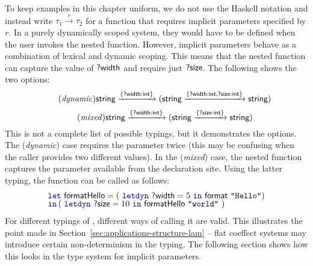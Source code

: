 To keep examples in this chapter uniform, we do not use the Haskell notation and instead
write $\tau_1 \xrightarrow{r} \tau_2$ for a function that requires implicit parameters specified by $r$.
In a purely dynamically scoped system, they would have to be defined when the user invokes the nested function.
However, implicit parameters behave as a combination of lexical and dynamic scoping. This means
that the nested function can capture the value of $\textnormal{\sffamily ?width}$ and require just $\textnormal{\sffamily ?size}$.
The following shows the two options:
%
\begin{equation}
\tag{\emph{dynamic}}
\ident{string} \xrightarrow{ \{ \ident{?width} : \ident{int} \} }
  (\ident{string} \xrightarrow{ \{ \ident{?width} : \ident{int}, \ident{?size} : \ident{int} \} } \ident{string})
\end{equation}
\vspace{-1em}
\begin{equation}
\tag{\emph{mixed}}
\ident{string} \xrightarrow{ \{ \ident{?width} : \ident{int} \} }
  (\ident{string} \xrightarrow{ \{ \ident{?size} : \ident{int} \} } \ident{string})
\end{equation}
%
This is not a complete list of possible typings, but it demonstrates the options. The (\emph{dynamic})
case requires the parameter  twice (this may be confusing when the caller provides
two different values). In the (\emph{mixed}) case, the nested function captures the  
parameter available from the declaration site. Using the latter typing, the function can be called as follows:\
%
\begin{equation*}
\begin{array}{l}
 \kvd{let}~\ident{formatHello} = (~\kvd{letdyn}~\ident{?width}=5~\kvd{in}~\ident{format}~\texttt{"Hello"})\\[-0.25em]
 \kvd{in}\,(~\kvd{letdyn}~\ident{?size} = 10~\kvd{in}~\ident{formatHello}~\texttt{"world"}~)
\end{array}
\end{equation*}
%
For different typings of , different ways of calling it are valid. This illustrates
the point made in Section~\ref{sec:applications-structure-lam} -- flat coeffect systems may 
introduce certain non-determinism in the typing. The following section shows how this looks in the
type system for implicit parameters.


